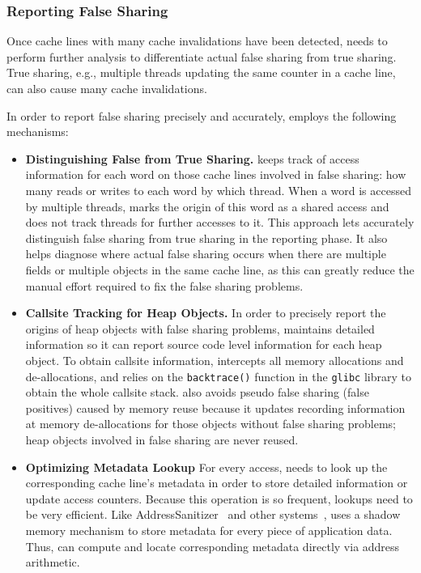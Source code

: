 \subsubsection{Reporting False Sharing}

Once cache lines with many cache invalidations have been detected,
\Predator{} needs to perform further analysis to differentiate actual false sharing from true sharing. 
True sharing, e.g., multiple threads updating the same counter in a cache line, can also cause many cache invalidations.

In order to report false sharing precisely and accurately,  
\Predator{} employs the following mechanisms:

\begin{itemize}
\item \textbf{Distinguishing False from True Sharing.} \Predator{} keeps track of access information for each word on those cache lines involved in false sharing: how many reads or writes to each word by which thread.  When a word is accessed by multiple threads, \Predator{} marks the origin of this word as a shared access and does not track threads for further accesses to it. This approach lets \Predator{} accurately distinguish false sharing from true sharing in the reporting phase.  It also helps diagnose where
actual false sharing occurs when there are multiple fields or multiple
objects in the same cache line, as this can greatly reduce the manual
effort required to fix the false sharing problems.

\item \textbf{Callsite Tracking for Heap Objects.} In order to precisely report the origins of heap objects with false
sharing problems, \Predator{} maintains detailed information so it can report source code level information for each heap
object. To obtain callsite information, \Predator{} intercepts all memory allocations and de-allocations, and relies
on the \texttt{backtrace()} function in the \texttt{glibc} library to obtain the whole callsite stack.
\Predator{} also avoids pseudo false sharing (false positives) caused by memory reuse because it updates recording information at memory de-allocations for those objects without false sharing problems; heap objects involved in false 
sharing are never reused.

\item \textbf{Optimizing Metadata Lookup}
For every access, \Predator{} needs to look up the corresponding cache line's metadata 
in order to store detailed information or update access counters. Because this operation is so frequent,
 lookups need to be very efficient.
Like 
AddressSanitizer~\cite{Addresssanitizer} and other systems~\cite{qinzhaodetection,Valgrind},
\Predator{} uses a shadow memory mechanism to store metadata for every piece of application data. 
Thus, \Predator{} can compute and locate corresponding metadata directly via address arithmetic.


\end{itemize}
